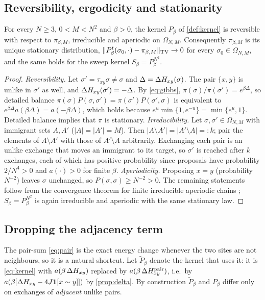 \subsection{Reversibility, ergodicity and stationarity}
\begin{theorem}\label{thm:correct}
For every $N\ge3$, $0<M<N^2$ and $\beta>0$, the kernel $P_\beta$ of \cref{def:kernel} is reversible with respect to $\pi_{\beta,M}$, irreducible and aperiodic on $\Omega_{N,M}$. Consequently $\pi_{\beta,M}$ is its unique stationary distribution, $\|P_\beta^t(\sigma_0,\cdot)-\pi_{\beta,M}\|_{\mathrm{TV}}\to0$ for every $\sigma_0\in\Omega_{N,M}$, and the same holds for the sweep kernel $S_\beta=P_\beta^{N^2}$.
\end{theorem}
\begin{proof}
\emph{Reversibility.} Let $\sigma'=\tau_{xy}\sigma\ne\sigma$ and $\Delta=\Delta H_{xy}(\sigma)$. The pair $\{x,y\}$ is unlike in $\sigma'$ as well, and $\Delta H_{xy}(\sigma')=-\Delta$. By \eqref{eq:gibbs}, $\pi(\sigma)/\pi(\sigma')=e^{\beta\Delta}$, so detailed balance $\pi(\sigma)P(\sigma,\sigma')=\pi(\sigma')P(\sigma',\sigma)$ is equivalent to $e^{\beta\Delta}a(\beta\Delta)=a(-\beta\Delta)$, which holds because $e^{u}\min\{1,e^{-u}\}=\min\{e^{u},1\}$. Detailed balance implies that $\pi$ is stationary.
\emph{Irreducibility.} Let $\sigma,\sigma'\in\Omega_{N,M}$ with immigrant sets $A,A'$ ($|A|=|A'|=M$). Then $|A\setminus A'|=|A'\setminus A|=:k$; pair the elements of $A\setminus A'$ with those of $A'\setminus A$ arbitrarily. Exchanging each pair is an unlike exchange that moves an immigrant to its target, so $\sigma'$ is reached after $k$ exchanges, each of which has positive probability since proposals have probability $2/N^4>0$ and $a(\cdot)>0$ for finite $\beta$.
\emph{Aperiodicity.} Proposing $x=y$ (probability $N^{-2}$) leaves $\sigma$ unchanged, so $P(\sigma,\sigma)\ge N^{-2}>0$.
The remaining statements follow from the convergence theorem for finite irreducible aperiodic chains \citep{levin2009}; $S_\beta=P_\beta^{N^2}$ is again irreducible and aperiodic with the same stationary law.
\end{proof}

\subsection{Dropping the adjacency term}
The pair-sum \eqref{eq:pair} is the exact energy change whenever the two sites are not neighbours, so it is a natural shortcut. Let $\tilde P_\beta$ denote the kernel that uses it: it is \eqref{eq:kernel} with $a(\beta\,\Delta H_{xy})$ replaced by $a(\beta\,\Delta H^{\mathrm{pair}}_{xy})$, i.e.\ by $a(\beta[\Delta H_{xy}-4J\mathbf{1}[x\sim y]])$ by \cref{prop:delta}. By construction $\tilde P_\beta$ and $P_\beta$ differ only on exchanges of \emph{adjacent} unlike pairs.

